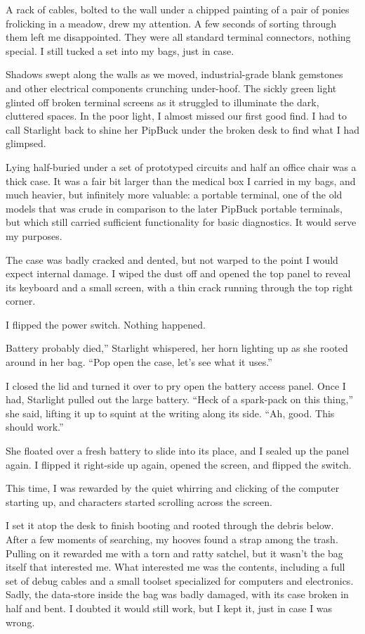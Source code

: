 A rack of cables, bolted to the wall under a chipped painting of a pair of ponies frolicking in a meadow, drew my attention. A few seconds of sorting through them left me disappointed. They were all standard terminal connectors, nothing special. I still tucked a set into my bags, just in case.

Shadows swept along the walls as we moved, industrial-grade blank gemstones and other electrical components crunching under-hoof. The sickly green light glinted off broken terminal screens as it struggled to illuminate the dark, cluttered spaces. In the poor light, I almost missed our first good find. I had to call Starlight back to shine her PipBuck under the broken desk to find what I had glimpsed.

Lying half-buried under a set of prototyped circuits and half an office chair was a thick case. It was a fair bit larger than the medical box I carried in my bags, and much heavier, but infinitely more valuable: a portable terminal, one of the old models that was crude in comparison to the later PipBuck portable terminals, but which still carried sufficient functionality for basic diagnostics. It would serve my purposes.

The case was badly cracked and dented, but not warped to the point I would expect internal damage. I wiped the dust off and opened the top panel to reveal its keyboard and a small screen, with a thin crack running through the top right corner.

I flipped the power switch. Nothing happened.

\leavevmode{}Battery probably died,” Starlight whispered, her horn lighting up as she rooted around in her bag. “Pop open the case, let’s see what it uses.”

I closed the lid and turned it over to pry open the battery access panel. Once I had, Starlight pulled out the large battery. “Heck of a spark-pack on this thing,” she said, lifting it up to squint at the writing along its side. “Ah, good. This should work.”

She floated over a fresh battery to slide into its place, and I sealed up the panel again. I flipped it right-side up again, opened the screen, and flipped the switch.

This time, I was rewarded by the quiet whirring and clicking of the computer starting up, and characters started scrolling across the screen.

I set it atop the desk to finish booting and rooted through the debris below. After a few moments of searching, my hooves found a strap among the trash. Pulling on it rewarded me with a torn and ratty satchel, but it wasn’t the bag itself that interested me. What interested me was the contents, including a full set of debug cables and a small toolset specialized for computers and electronics. Sadly, the data-store inside the bag was badly damaged, with its case broken in half and bent. I doubted it would still work, but I kept it, just in case I was wrong.

